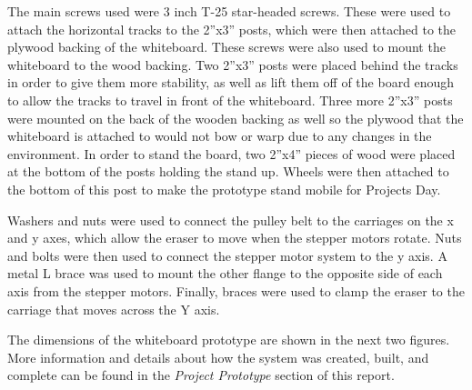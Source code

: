 The main screws used were 3 inch T-25 star-headed screws. These were used to attach the horizontal tracks to the 2''x3'' posts, which were then attached to the plywood backing of the whiteboard. These screws were also used to mount the whiteboard to the wood backing. Two 2''x3'' posts were placed behind the tracks in order to give them more stability, as well as lift them off of the board enough to allow the tracks to travel in front of the whiteboard. Three more 2''x3'' posts were mounted on the back of the wooden backing as well so the plywood that the whiteboard is attached to would not bow or warp due to any changes in the environment. In order to stand the board, two 2''x4'' pieces of wood were placed at the bottom of the posts holding the stand up. Wheels were then attached to the bottom of this post to make the prototype stand mobile for Projects Day.\par
\setlength{\parindent}{2.5ex}
Washers and nuts were used to connect the pulley belt to the carriages on the x and y axes, which allow the eraser to move when the stepper motors rotate. Nuts and bolts were then used to connect the stepper motor system to the y axis. A metal L brace was used to mount the other flange to the opposite side of each axis from the stepper motors. Finally, braces were used to clamp the eraser to the carriage that moves across the Y axis.\par
\setlength{\parindent}{2.5ex}
The dimensions of the whiteboard prototype are shown in the next two figures. More information and details about how the system was created, built, and complete can be found in the \textit{Project Prototype} section of this report.

